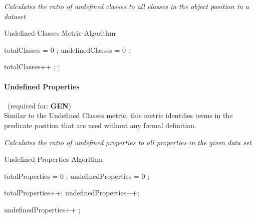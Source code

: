 \begin{mdframed}[style=metricdefinition]
\emph{Calculates the ratio of undefined classes to all classes in the object position in a dataset}
\end{mdframed}

\begin{algorithm}
\caption{Undefined Classes Metric Algorithm}\label{lst:undefCl}
\begin{algorithmic}[1]
\State totalClasses = 0 ;
\State undefinedClasses = 0 ;
\EndProcedure

  totalClasses++ ;\EndIf
{}; \EndIf
\EndProcedure
\end{algorithmic}
\end{algorithm}


\paragraph{Undefined Properties}~(required for: \textbf{GEN})~\\ 
Similar to the Undefined Classes metric, this metric identifies terms in the predicate position that are used without any formal definition.

\begin{mdframed}[style=metricdefinition]
\emph{Calculates the ratio of undefined properties to all properties in the given data set}
\end{mdframed}

\begin{algorithm}
\caption{Undefined Properties Algorithm}
\begin{algorithmic}[1]
\State totalProperties = 0 ;
\State undefinedProperties = 0 ;
\EndProcedure

 totalProperties++; \EndIf 
{} undefinedProperties++; \EndIf

 undefinedProperties++ ; \EndIf
\EndProcedure
\end{algorithmic}
\end{algorithm}

